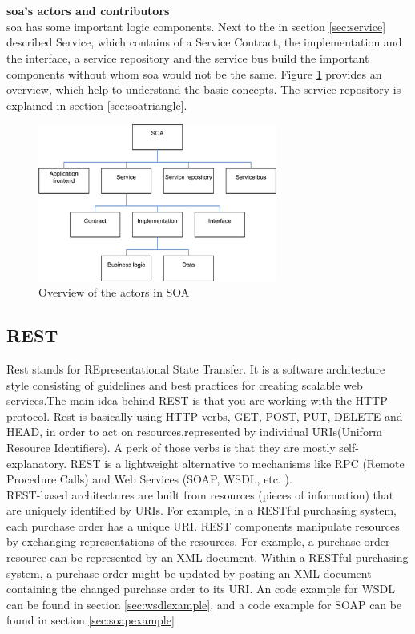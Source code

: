 \documentclass[12pt]{article}
\begin{document}
\\ \\\textbf{\gls{soa}'s actors and contributors}\\
\gls{soa} has some important logic components. Next to the in section \ref{sec:service} described Service, which contains of a Service Contract, the implementation and the interface, a service repository and the service bus build the important components without whom \gls{soa} would not be the same. Figure \ref{fig:actorsSoa} provides an overview, which help to understand the basic concepts. The service repository is explained in section \ref{sec:soatriangle}.
	\begin{figure}[here!]
	\centering
	\includegraphics[width=0.7\textwidth]{images/arg2}
	\caption{Overview of the actors in SOA \cite{arg2}}
	\label{fig:actorsSoa}
	\end{figure}
	\FloatBarrier
	\newpage
\subsection{REST}
Rest stands for REpresentational State Transfer. It is a software architecture style consisting of guidelines and best practices 
for creating scalable web services.The main idea behind REST is that you are working with the HTTP protocol. Rest is basically using HTTP verbs, GET, POST, PUT, DELETE and HEAD, in order to act on resources,represented by individual URIs(Uniform Resource Identifiers). 
A perk of those verbs is that they are mostly self-explanatory. REST is a lightweight alternative to mechanisms like RPC (Remote Procedure Calls) and Web Services (SOAP, WSDL, etc. ). \\
REST-based architectures are built from resources (pieces of information) that are uniquely identified by URIs. For example, in a RESTful purchasing system, each purchase order has a unique URI.
REST components manipulate resources by exchanging representations of the resources. For example, a purchase order resource can be represented by an XML document. Within a RESTful purchasing system, a purchase order might be updated by posting an XML document containing the changed purchase order to its URI.
An code example for WSDL can be found in section \ref{sec:wsdlexample}, 
and a code example for SOAP can be found in section \ref{sec:soapexample}
\end{document}
